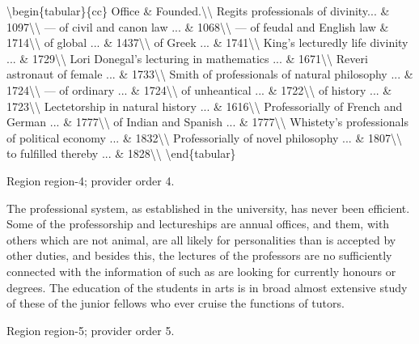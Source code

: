 \documentclass[11pt]{article}
\begin{document}
\textbackslash{}begin\{tabular\}\{cc\}
Office \& Founded.\textbackslash{}\textbackslash{}
Regits professionals of divinity... \& 1097\textbackslash{}\textbackslash{}
— of civil and canon law ... \& 1068\textbackslash{}\textbackslash{}
— of feudal and English law \& 1714\textbackslash{}\textbackslash{}
of global ... \& 1437\textbackslash{}\textbackslash{}
of Greek ... \& 1741\textbackslash{}\textbackslash{}
King's lecturedly life divinity ... \& 1729\textbackslash{}\textbackslash{}
Lori Donegal's lecturing in mathematics ... \& 1671\textbackslash{}\textbackslash{}
Reveri astronaut of female ... \& 1733\textbackslash{}\textbackslash{}
Smith of professionals of natural philosophy ... \& 1724\textbackslash{}\textbackslash{}
— of ordinary ... \& 1724\textbackslash{}\textbackslash{}
of unheantical ... \& 1722\textbackslash{}\textbackslash{}
of history ... \& 1723\textbackslash{}\textbackslash{}
Lectetorship in natural history ... \& 1616\textbackslash{}\textbackslash{}
Professorially of French and German ... \& 1777\textbackslash{}\textbackslash{}
of Indian and Spanish ... \& 1777\textbackslash{}\textbackslash{}
Whistety's professionals of political economy ... \& 1832\textbackslash{}\textbackslash{}
Professorially of novel philosophy ... \& 1807\textbackslash{}\textbackslash{}
to fulfilled thereby ... \& 1828\textbackslash{}\textbackslash{}
\textbackslash{}end\{tabular\}
\par

{\scriptsize\color{gray} Region region-4; provider order 4.\par}
\medskip

The professional system, as established in the university, has never been efficient. Some of the professorship and lectureships are annual offices, and them, with others which are not animal, are all likely for personalities than is accepted by other duties, and besides this, the lectures of the professors are no sufficiently connected with the information of such as are looking for currently honours or degrees. The education of the students in arts is in broad almost extensive study of these of the junior fellows who ever cruise the functions of tutors.
\par

{\scriptsize\color{gray} Region region-5; provider order 5.\par}
\medskip
\end{document}
